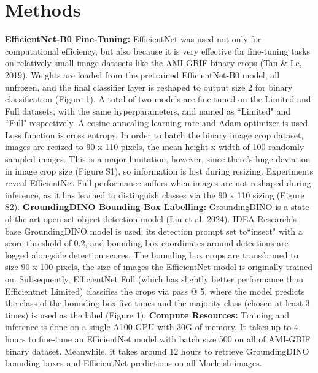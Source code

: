 \documentclass[twocolumn]{article}
\newcommand\tab[1][1cm]{\hspace*{#1}}
\begin{document}
    \section{Methods}

    \textbf{EfficientNet-B0 Fine-Tuning:} EfficientNet was used not only for computational efficiency,
    but also because it is very effective for fine-tuning tasks
    on relatively small image datasets like the AMI-GBIF binary crops (Tan \& Le, 2019). 
    Weights are loaded
    from the pretrained EfficientNet-B0 model, all unfrozen, and the final classifier layer
    is reshaped to output size 2 for binary classification (Figure 1). \newline
   \tab A total of two models are fine-tuned on the Limited and Full datasets, with the same hyperparameters,
    and named as ``Limited" and ``Full" respectively. A cosine annealing learning rate
    and Adam optimizer is used. Loss function is cross entropy.
    In order to batch the binary image crop dataset,
     images are resized to 90 x 110 pixels, 
    the mean height x width of 100 randomly sampled images. This is a major limitation, however,
    since there's huge deviation in image crop size (Figure S1), so information is lost during resizing. 
    Experiments reveal EfficientNet Full 
    performance suffers when images are not reshaped during inference, 
    as it has learned to distinguish classes via the 90 x 110 sizing (Figure S2). 
    \newline
    \textbf{GroundingDINO Bounding Box Labelling:} 
    GroundingDINO is a state-of-the-art open-set object detection model (Liu et al,
    2024).
    IDEA Research's base GroundingDINO model is used, its detection prompt set
    to``insect" with a score threshold of 0.2, and  bounding box coordinates around detections are logged alongside detection scores.
    The bounding box crops are transformed to size 90 x 100 pixels, the size of images the EfficientNet model is
    originally trained on.
    Subsequently, EfficientNet Full 
    (which has slightly better performance than Efficientnet Limited) 
    classifies the crops via pass @ 5, where
    the model predicts the class of the bounding box five times and the majority class
    (chosen at least 3 times) is used as the label (Figure 1).  
    \newline
    \textbf{Compute Resources:} Training and inference is done on a single A100 GPU 
    with 30G of memory. It takes up to 4 hours to fine-tune an EfficientNet model with
    batch size 500 on all of AMI-GBIF binary dataset.
    Meanwhile, it takes around 12 hours to retrieve GroundingDINO bounding boxes and 
    EfficientNet predictions on all Macleish images. 
    \nobreak  
\end{document}
